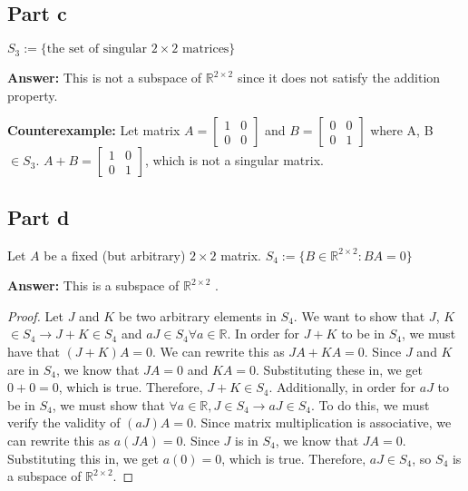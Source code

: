 \documentclass{article}
\begin{document}
\subsection*{Part c}
$S_{3} := \{\text{the set of singular } 2 \times 2 \text{ matrices}\}$

\textbf{Answer:} This is not a subspace of $\mathbb{R}^{2 \times 2}$ since it does not satisfy the addition property. %

\textbf{Counterexample:} Let matrix $A = \begin{bmatrix} 1 & 0 \\ 0 & 0 \end{bmatrix}$ and $B = \begin{bmatrix} 0 & 0 \\ 0 & 1 \end{bmatrix}$ where A, B $\in S_{3}$.
$A + B = \begin{bmatrix} 1 & 0 \\ 0 & 1 \end{bmatrix}$, which is not a singular matrix.

\subsection*{Part d}
Let \( A \) be a fixed (but arbitrary) \( 2 \times 2 \) matrix.
\newline
$S_{4} := \{B \in \mathbb{R}^{2 \times 2} : BA = 0\}$

\textbf{Answer:} This is a subspace of $\mathbb{R}^{2 \times 2}$ .

\begin{proof}
Let $J$ and $K$ be two arbitrary elements in $S_{4}$.
We want to show that $J$, $K$ $\in S_{4} \rightarrow J + K \in S_{4}$ and $aJ \in S_{4} \forall a \in \mathbb{R}$.
In order for $J + K$ to be in $S_{4}$, we must have that $(J+K)A = 0$.
We can rewrite this as $JA + KA = 0$.
Since $J$ and $K$ are in $S_{4}$, we know that $JA = 0$ and $KA = 0$.
Substituting these in, we get $0 + 0 = 0$, which is true.
Therefore, $J + K \in S_{4}$.
Additionally, in order for $aJ$ to be in $S_{4}$, we must show that $\forall a \in \mathbb{R}, J \in S_{4} \rightarrow aJ \in S_{4}$.
To do this, we must verify the validity of $(aJ)A = 0$.
Since matrix multiplication is associative, we can rewrite this as $a(JA) = 0$.
Since $J$ is in $S_{4}$, we know that $JA = 0$.
Substituting this in, we get $a(0) = 0$, which is true.
Therefore, $aJ \in S_{4}$, so $S_{4}$ is a subspace of $\mathbb{R}^{2 \times 2}$.
\end{proof}
\end{document}
